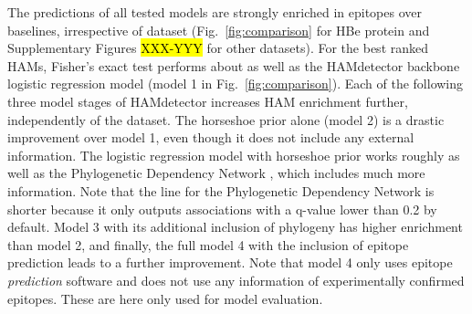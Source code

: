 \documentclass{bioinfo}
\begin{document}


The predictions of all tested models are strongly enriched in epitopes over baselines, irrespective of dataset (Fig.~\ref{fig:comparison} for HBe protein and Supplementary Figures \hl{XXX-YYY} for other datasets). For the best ranked HAMs, Fisher's exact test performs about as well as the HAMdetector backbone logistic regression model (model 1 in Fig.~\ref{fig:comparison}). Each of the following three model stages of HAMdetector increases HAM enrichment further, independently of the dataset.
The horseshoe prior alone (model 2) is a drastic improvement over model 1, even though it does not include any external information. The logistic regression model with horseshoe prior works roughly as well as the Phylogenetic Dependency Network \cite{Carlson2008}, which includes much more information. Note that the line for the Phylogenetic Dependency Network is shorter because it only outputs associations with a q-value lower than 0.2 by default. Model 3 with its additional inclusion of phylogeny has higher enrichment than model 2, and finally, the full model 4 with the inclusion of epitope prediction leads to a further improvement. Note that model 4 only uses epitope \textit{prediction} software and does not use any information of experimentally confirmed epitopes. These are here only used for model evaluation.
\end{document}

